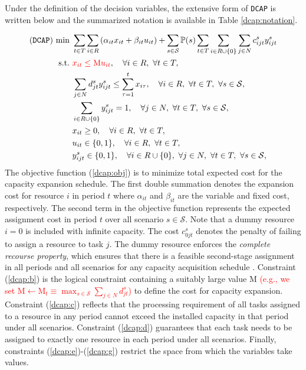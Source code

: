Under the definition of the decision variables, the extensive form of \texttt{DCAP} is written below and the summarized notation is available in Table \ref{dcap:notation}.

\begin{subequations} \label{dcap:formulation}
	\begin{align}
	(\texttt{DCAP})\ \textrm{min}\ &\sum_{t\in T}\sum_{i\in R}\left(\alpha_{it}x_{it}+\beta_{it}u_{it}\right)+\sum_{s\in\mathcal{S}}\PP(s)\sum_{t\in T}\sum_{i\in R\cup\{0\}}\sum_{j\in N}c_{ijt}^{s}y_{ijt}^s	\label{dcap:obj} \\
	\textrm{s.t.}\ & \textcolor{red}{x_{it}\le \textrm{M}u_{it}},\quad\forall i\in R,\ \forall t\in T,	\label{dcap:b}\\
	&\sum_{j\in N}d_{jt}^s y_{ijt}^s\le\sum_{\tau=1}^{t}x_{i\tau},\quad\forall i\in R,\ \forall t\in T,\ \forall s\in\mathcal{S},\label{dcap:c}\\
	&\sum_{i\in R\cup \{0\}}y_{ijt}^s=1,\quad\forall j\in N,\ \forall t\in T,\ \forall s\in\mathcal{S}, \label{dcap:d} \\
	&x_{it}\ge 0,\quad\forall i\in R,\ \forall t\in T,\label{dcap:e} \\
	&u_{it}\in\{0,1\}, \quad\forall i\in R,\ \forall t\in T,\label{dcap:f}\\
	&y_{ijt}^s\in\{0,1\},\quad\forall i\in R\cup\{0\},\ \forall j\in N,\ \forall t\in T,\ \forall s\in\mathcal{S},\label{dcap:g}
	\end{align}
\end{subequations}
The objective function (\ref{dcap:obj}) is to minimize total expected cost for the capacity expansion schedule. The first double summation denotes the expansion cost for resource $i$ in period $t$ where $\alpha_{it}$ and $\beta_{it}$ are the variable and fixed cost, respectively. The second term in the objective function represents the expected assignment cost in period $t$ over all scenario $s\in\mathcal{S}$. Note that a dummy resource $i=0$ is included with infinite capacity. The cost $c_{0jt}^s$ denotes the penalty of failing to assign a resource to task $j$. The dummy resource enforces the \textit{complete recourse property}, which ensures that there is a feasible second-stage assignment in all periods and all scenarios for any capacity acquisition schedule \cite{journal:AG2004}. Constraint (\ref{dcap:b}) is the logical constraint containing a suitably large value M \textcolor{red}{(e.g., we set $\textrm{M}\leftarrow \textrm{M}_{t}\equiv \max_{s\in\mathcal{S}} \sum_{j\in N} d_{jt}^s$)} to define the cost for capacity expansion. Constraint (\ref{dcap:c}) reflects that the processing requirement of all tasks assigned to a resource in any period cannot exceed the installed capacity in that period under all scenarios. Constraint (\ref{dcap:d}) guarantees that each task needs to be assigned to exactly one resource in each period under all scenarios. Finally, constraints (\ref{dcap:e})-(\ref{dcap:g}) restrict the space from which the variables take values.


